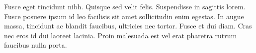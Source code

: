 Fusce eget tincidunt nibh. Quisque sed velit felis. Suspendisse in sagittis lorem. Fusce posuere ipsum id leo facilisis sit amet sollicitudin enim egestas. In augue massa, tincidunt ac blandit faucibus, ultricies nec tortor. Fusce et dui diam. Cras nec eros id dui laoreet lacinia. Proin malesuada est vel erat pharetra rutrum faucibus nulla porta.
